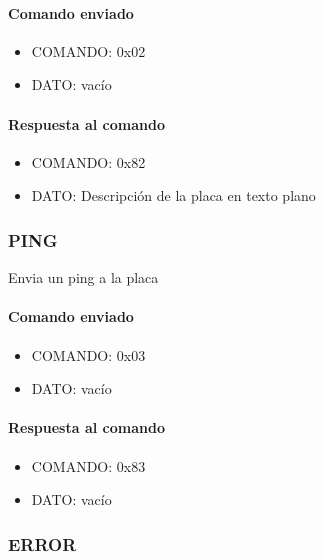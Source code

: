 \paragraph*{Comando enviado}
\label{hA_protocolo_reset_comando_enviado}

\begin{itemize}
	\item{COMANDO:} 0x02
	\item{DATO:} vac\'io
\end{itemize}

\paragraph*{Respuesta al comando}
\label{hA_protocolo_reset_respuesta}

\begin{itemize}
	\item{COMANDO:} 0x82
	\item{DATO:} Descripci\'on de la placa en texto plano
\end{itemize}

\subsubsection{PING}
\label{hA_protocolo_ping}

Envia un ping a la placa

\paragraph*{Comando enviado}
\label{hA_protocolo_ping_comando_enviado}

\begin{itemize}
	\item{COMANDO:} 0x03
	\item{DATO:} vac\'io
\end{itemize}

\paragraph*{Respuesta al comando}
\label{hA_protocolo_ping_respuesta}

\begin{itemize}
	\item{COMANDO:} 0x83
	\item{DATO:} vac\'io
\end{itemize}

\subsubsection{ERROR}
\label{hA_protocolo_error}


